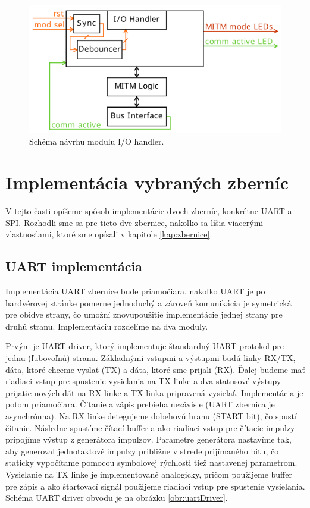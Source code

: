 \begin{figure}
    \centerline{\includegraphics[width=1\textwidth]{images/designs/ioHandler.pdf}}
    \caption[Schéma návrhu modulu I/O handler]{Schéma návrhu modulu I/O handler.}
    \label{obr:ioHandler}
\end{figure}

\section{Implementácia vybraných zberníc}
V tejto časti opíšeme spôsob implementácie dvoch zberníc, konkrétne UART a SPI. Rozhodli sme sa pre tieto dve zbernice, nakoľko sa líšia viacerými vlastnosťami, ktoré sme opísali v kapitole \ref{kap:zbernice}.

\subsection{UART implementácia}
Implementácia UART zbernice bude priamočiara, nakoľko UART je po hardvérovej stránke pomerne jednoduchý a zároveň komunikácia je symetrická pre obidve strany, čo umožní znovupoužitie implementácie jednej strany pre druhú stranu. Implementáciu rozdelíme na dva moduly.

Prvým je UART driver, ktorý implementuje štandardný UART protokol pre jednu (ľubovoľnú) stranu. Základnými vstupmi a výstupmi budú linky RX/TX, dáta, ktoré chceme vyslať (TX) a dáta, ktoré sme prijali (RX). Ďalej budeme mať riadiaci vstup pre spustenie vysielania na TX linke a dva statusové výstupy -- prijatie nových dát na RX linke a TX linka pripravená vysielať. Implementácia je potom priamočiara. Čítanie a zápis prebieha nezávisle (UART zbernica je asynchrónna). Na RX linke detegujeme dobehovú hranu (START bit), čo spustí čítanie. Následne spustíme čítací buffer a ako riadiaci vstup pre čítacie impulzy pripojíme výstup z generátora impulzov. Parametre generátora nastavíme tak, aby generoval jednotaktové impulzy približne v strede prijímaného bitu, čo staticky vypočítame pomocou symbolovej rýchlosti tiež nastavenej parametrom. Vysielanie na TX linke je implementované analogicky, pričom použijeme buffer pre zápis a ako štartovací signál použijeme riadiaci vstup pre spustenie vysielania. Schéma UART driver obvodu je na obrázku \ref{obr:uartDriver}.

